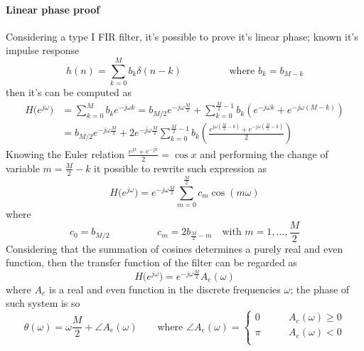 		\paragraph{Linear phase proof} Considering a type I FIR filter, it's possible to prove it's linear phase; known it's impulse response
		\[ h(n) = \sum_{k=0}^M b_k \delta(n-k) \hspace{2cm} \textrm{where } b_k = b_{M-k} \]
		then it's \dtft can be computed as
		\begin{align*}
			H\big(e^{j\omega}\big) & = \sum_{k=0}^M b_k e^{-j\omega k} = b_{M/2} e^{-j\omega \frac M2} + \sum_{k=0}^{\frac M2 -1} b_k \left( e^{-j\omega k} + e^{-j\omega(M-k)} \right) \\
			& = b_{M/2} e^{-j\omega \frac M2} + 2 e^{-j\omega \frac M2} \sum_{k=0}^{\frac M2 -1} b_k \left( \frac{e^{j\omega \left(\frac M2 - k\right)} + e^{-j\omega \left(\frac M2 - k\right)} }{2} \right)
		\end{align*}
		Knowing the Euler relation $\frac{e^{jx} + e^{-jx}}{2} = \cos x$ and performing the change of variable $m = \frac M 2 - k$ it possible to rewrite such expression as
		\[ H\big(e^{j\omega}\big) = e^{-j\omega \frac M2} \sum_{m=0}^{\frac M2} c_m \cos (m \omega) \]
		where
		\[ c_0 = b_{M/2} \hspace{2cm} c_m = 2 b_{\frac M2 -m} \quad \textrm{with } m = 1,\dots, \frac M2 \]
		Considering that the summation of cosines determines a purely real and even function, then the transfer function of the filter can be regarded as
		\begin{equation}
			H\big(e^{j\omega}\big) = e^{-j\omega \frac M2} A_e(\omega)
		\end{equation}
		where $A_e$ is a real and even function in the discrete frequencies $\omega$; the phase of such system is so
		\[ \theta(\omega) = \omega \frac M 2 + \angle A_e(\omega) \qquad \textrm{where } \angle A_e(\omega) = \begin{cases}
			0 \qquad & A_e(\omega) \geq 0 \\
			\pi \qquad & A_e(\omega) < 0 \\
		\end{cases} \]
	
